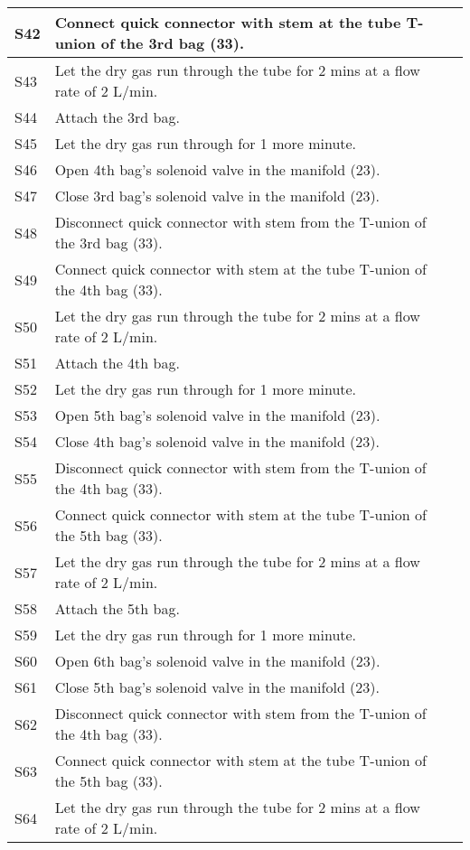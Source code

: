 \begin{longtable} {|m{}|m{}|m{}|}
S42 & Connect quick connector with stem at the tube T-union of the 3rd bag (33). & \\ \hline
S43 & Let the dry gas run through the tube for 2 mins at a flow rate of 2 L/min. & \\ \hline
S44 & Attach the 3rd bag. & \\ \hline
S45 & Let the dry gas run through for 1 more minute. & \\ \hline
S46 & Open 4th bag's solenoid valve in the manifold (23). & \\ \hline
S47 & Close 3rd bag's solenoid valve in the manifold (23). & \\ \hline
S48 & Disconnect quick connector with stem from the T-union of the 3rd bag (33). & \\ \hline
S49 & Connect quick connector with stem at the tube T-union of the 4th bag (33). & \\ \hline
S50 & Let the dry gas run through the tube for 2 mins at a flow rate of 2 L/min. & \\ \hline
S51 & Attach the 4th bag. & \\ \hline
S52 & Let the dry gas run through for 1 more minute. & \\ \hline
S53 & Open 5th bag's solenoid valve in the manifold (23). & \\ \hline
S54 & Close 4th bag's solenoid valve in the manifold (23). & \\ \hline
S55 & Disconnect quick connector with stem from the T-union of the 4th bag (33). & \\ \hline
S56 & Connect quick connector with stem at the tube T-union of the 5th bag (33). & \\ \hline
S57 & Let the dry gas run through the tube for 2 mins at a flow rate of 2 L/min. & \\ \hline
S58 & Attach the 5th bag. & \\ \hline
S59 & Let the dry gas run through for 1 more minute. & \\ \hline
S60 & Open 6th bag's solenoid valve in the manifold (23). & \\ \hline
S61 & Close 5th bag's solenoid valve in the manifold (23). & \\ \hline
S62 & Disconnect quick connector with stem from the T-union of the 4th bag (33). & \\ \hline
S63 & Connect quick connector with stem at the tube T-union of the 5th bag (33). & \\ \hline
S64 & Let the dry gas run through the tube for 2 mins at a flow rate of 2 L/min. & \\ \hline

\end{longtable}
